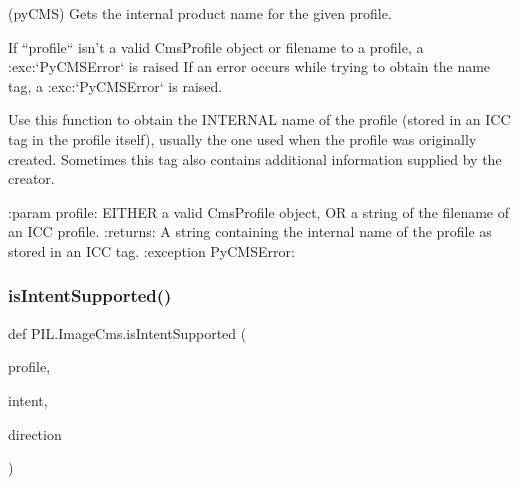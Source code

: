 \begin{DoxyVerb}(pyCMS) Gets the internal product name for the given profile.

If ``profile`` isn't a valid CmsProfile object or filename to a profile,
a :exc:`PyCMSError` is raised If an error occurs while trying
to obtain the name tag, a :exc:`PyCMSError` is raised.

Use this function to obtain the INTERNAL name of the profile (stored
in an ICC tag in the profile itself), usually the one used when the
profile was originally created.  Sometimes this tag also contains
additional information supplied by the creator.

:param profile: EITHER a valid CmsProfile object, OR a string of the
    filename of an ICC profile.
:returns: A string containing the internal name of the profile as stored
    in an ICC tag.
:exception PyCMSError:
\end{DoxyVerb}
 \mbox{\label{namespacePIL_1_1ImageCms_a2b5c62cc23c2223c3ff86f245c7f2d5d}} 
\subsubsection{\texorpdfstring{is\+Intent\+Supported()}{isIntentSupported()}}
{\footnotesize\ttfamily def P\+I\+L.\+Image\+Cms.\+is\+Intent\+Supported (\begin{DoxyParamCaption}\item[{}]{profile,  }\item[{}]{intent,  }\item[{}]{direction }\end{DoxyParamCaption})}


